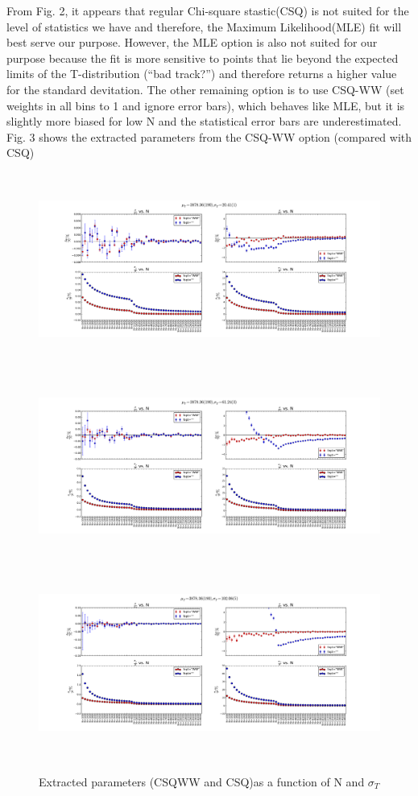 \documentclass[12pt]{article}
\begin{document}
From Fig. 2, it appears that regular Chi-square stastic(CSQ) is not suited for the level of statistics we have and therefore, the Maximum Likelihood(MLE) fit will best serve our purpose. However, the MLE option is also not suited for our purpose because the fit is more sensitive to points that lie beyond the expected limits of the T-distribution (``bad track?'') and therefore returns a higher value for the standard devitation. The other remaining option is to use CSQ-WW (set weights in all bins to 1 and ignore error bars), which behaves like MLE, but it is slightly more biased for low N and the statistical error bars are underestimated. Fig. 3 shows the extracted parameters from the CSQ-WW option (compared with CSQ)

\begin{figure}[ht]
	\includegraphics[height=2.5in,width=5.5in]{fit-comp_MU-190_SG-1_fit-opt-WW_binw-025.pdf}
	\includegraphics[height=2.5in,width=5.5in]{fit-comp_MU-190_SG-3_fit-opt-WW_binw-025.pdf}
	\includegraphics[height=2.5in,width=5.5in]{fit-comp_MU-190_SG-5_fit-opt-WW_binw-025.pdf}
	\caption{Extracted parameters (CSQWW and CSQ)as a function of N and $\sigma_{T}$}
	\label{fig3}
\end{figure}
\end{document}
